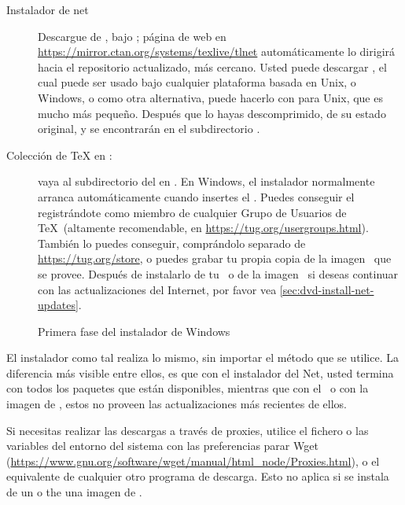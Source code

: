 \documentclass{article}
\begin{document}
\begin{description}
	\item [Instalador de net] Descargue de \CTAN{}, bajo
		; página de web en
		\url{https://mirror.ctan.org/systems/texlive/tlnet}
		automáticamente lo dirigirá hacia el repositorio
		actualizado, más cercano. Usted puede  descargar
		, el cual puede ser usado
		bajo cualquier plataforma basada en Unix, o Windows, o
		como otra alternativa, puede hacerlo con
		 para Unix, que es mucho
		más pequeño. Después que lo hayas descomprimido, de
		su estado original,  y
		 se encontrarán en el
		subdirectorio .

\item [Colección de \TeX{} en \DVD:] vaya al subdirectorio del \DVD en
	. En Windows, el instalador normalmente
	arranca automáticamente cuando insertes el \DVD. Puedes
	conseguir el \DVD\, registrándote como miembro de cualquier
	Grupo de Usuarios de \TeX\ (altamente recomendable, en
	\url{https://tug.org/usergroups.html}). También lo puedes
	conseguir, comprándolo separado de \url{https://tug.org/store},
	o puedes grabar tu propia copia de la imagen \ISO\ que se
	provee. Después de instalarlo de tu \DVD\, o de la imagen
	\ISO\, si deseas continuar con las actualizaciones del
	Internet, por favor vea \ref{sec:dvd-install-net-updates}.

\end{description}

\begin{figure}[tb]
\caption{Primera fase del instalador de Windows  }\label{fig:nsis}
\end{figure}

El instalador como tal realiza lo mismo, sin importar el método que
se utilice. La diferencia más visible entre ellos, es que con el
instalador del Net, usted termina con todos los paquetes que están
disponibles, mientras que con el \DVD\ o con la imagen de
\ISO, estos no proveen las actualizaciones más recientes de
ellos.

Si necesitas realizar las descargas a través de proxies, utilice el fichero  o las variables del entorno del sistema con las preferencias parar Wget (\url{https://www.gnu.org/software/wget/manual/html_node/Proxies.html}), o el equivalente de cualquier otro programa de descarga. Esto no aplica si se instala de un \DVD o the una imagen de \ISO.
\end{document}
